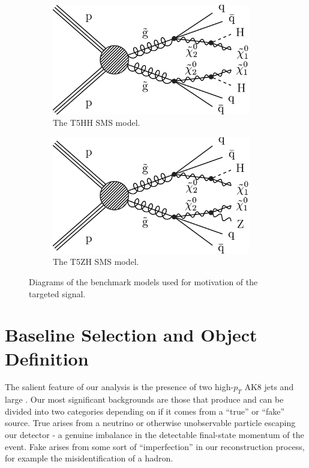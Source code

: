 \begin{figure}[hbp!]
\centering
\begin{subfigure}[b]{0.425\textwidth}
\includegraphics[width=0.95\textwidth]{figs/CMS-SUS-17-006_Figure_001.pdf}
\caption{The T5HH SMS model.}
\label{fig:t5hh}
\end{subfigure}
\begin{subfigure}[b]{0.425\textwidth}
\includegraphics[width=0.95\textwidth]{figs/CMS-SUS-17-006_Figure-aux_001.pdf}
\caption{The T5ZH SMS model.}
\label{fig:t5zh}
\end{subfigure}
\caption{Diagrams of the benchmark models used for motivation of the targeted signal.}
\label{fig:sms}
\end{figure}

\section{Baseline Selection and Object Definition}
\label{sec:baseline}

The salient feature of our analysis is the presence of two high-$p_{T}$ AK8 jets and large \ptmiss. Our most significant backgrounds are those that produce \ptmiss and can be divided into two categories depending on if it comes from a ``true'' or ``fake'' source. True \ptmiss arises from a neutrino or otherwise unobservable particle escaping our detector - a genuine imbalance in the detectable final-state momentum of the event. Fake \ptmiss arises from some sort of ``imperfection'' in our reconstruction process, for example the misidentification of a hadron. 

